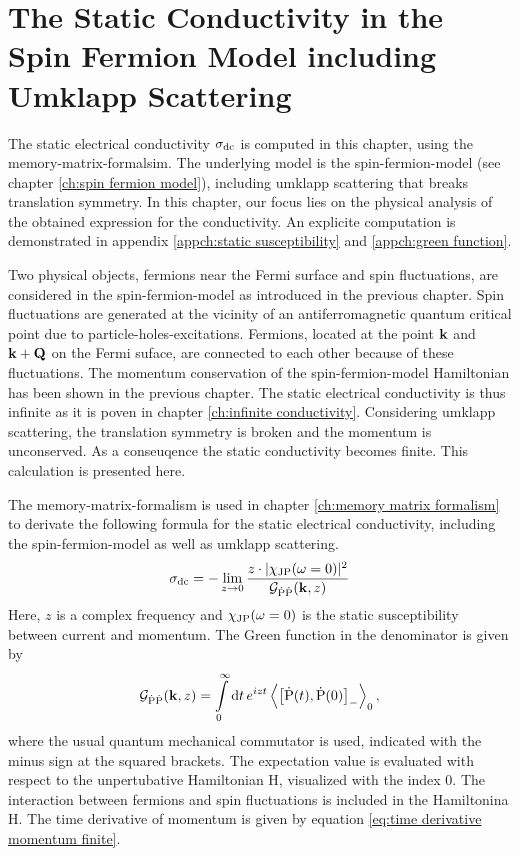 %
%
%
\chapter{The Static Conductivity in the Spin Fermion Model including Umklapp Scattering}
\label{ch:calculation}
%
%
%
The static electrical conductivity $\sigma_{\mathrm{dc}}$ is computed in this chapter, using the memory-matrix-formalsim.
The underlying model is the spin-fermion-model (see chapter \ref{ch:spin fermion model}), including umklapp scattering that breaks translation symmetry.
In this chapter, our focus lies on the physical analysis of the obtained expression for the conductivity.
An explicite computation is demonstrated in appendix \ref{appch:static susceptibility} and \ref{appch:green function}.

%
%
%
%
Two physical objects, fermions near the Fermi surface and spin fluctuations, are considered in the spin-fermion-model as introduced in the previous chapter.
Spin fluctuations are generated at the vicinity of an antiferromagnetic quantum critical point due to particle-holes-excitations.
Fermions, located at the point $\vb{k}$ and $\vb{k}+\vb{Q}$ on the Fermi suface, are connected to each other because of these fluctuations.
The momentum conservation of the spin-fermion-model Hamiltonian has been shown in the previous chapter.
The static electrical conductivity is thus infinite as it is poven in chapter \ref{ch:infinite conductivity}.
Considering umklapp scattering, the translation symmetry is broken and the momentum is unconserved.
As a conseuqence the static conductivity becomes finite.
This calculation is presented here.

The memory-matrix-formalism is used in chapter \ref{ch:memory matrix formalism} to derivate the following formula for the static electrical conductivity, including the spin-fermion-model as well as umklapp scattering.
%
\begin{align}
	\sigma_{\mathrm{dc}} = -\lim\limits_{z \to 0} \frac{z \cdot |\chi_{\mathrm{JP}}(\omega = 0)|^{2}}{\mathcal{G}_{\dot{\mathrm{P}}\dot{\mathrm{P}}}(\vb{k}, z)}
	\label{eq:static conductivity formula}
\end{align}
%
Here, $z$ is a complex frequency and $\chi_{\mathrm{JP}}(\omega = 0)$ is the static susceptibility between current and momentum.
The Green function in the denominator is given by
%
\begin{align}
	\mathcal{G}_{\dot{\mt{P}}\dot{\mt{P}}}(\vb{k}, z) = \int\limits_{0}^{\infty} \dd{t} e^{izt} \expval{\comm{\dot{\mt{P}}(t)}{\dot{\mt{P}}(0)}_{-}}_{0},
	\label{eq:Green function}
\end{align}
%
where the usual quantum mechanical commutator is used, indicated with the minus sign at the squared brackets.
The expectation value is evaluated with respect to the unpertubative Hamiltonian H, visualized with the index 0.
The interaction between fermions and spin fluctuations is included in the Hamiltonina H.
The time derivative of momentum is given by equation \eqref{eq:time derivative momentum finite}.

